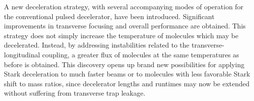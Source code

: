 \documentclass[%
 reprint,
 amsmath,amssymb,
 aps,
prl,
]{revtex4-1}
\begin{document}



A new deceleration strategy, with several accompanying modes of operation for the conventional pulsed decelerator, have been introduced. 
Significant improvements in transverse focusing and overall performance are obtained.
This strategy does not simply increase the temperature of molecules which may be decelerated.
Instead, by addressing instabilities related to the transverse-longitudinal coupling, a greater flux of molecules at the same temperatures as before is obtained.
This discovery opens up brand new possibilities for applying Stark deceleration to much faster beams or to molecules with less favorable Stark shift to mass ratios, since decelerator lengths and runtimes may now be extended without suffering from transverse trap leakage.
\end{document}
